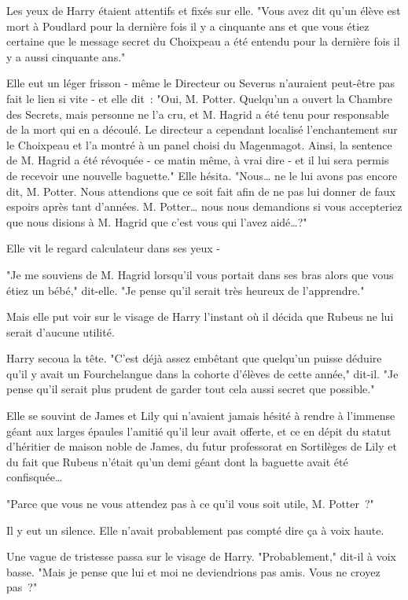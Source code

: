 Les yeux de Harry étaient attentifs et fixés sur elle. "Vous avez dit qu'un élève est mort à Poudlard pour la dernière fois il y a cinquante ans et que vous étiez certaine que le message secret du Choixpeau a été entendu pour la dernière fois il y a aussi cinquante ans."

Elle eut un léger frisson - même le Directeur ou Severus n'auraient peut-être pas fait le lien si vite - et elle dit~: "Oui, M. Potter. Quelqu'un a ouvert la Chambre des Secrets, mais personne ne l'a cru, et M. Hagrid a été tenu pour responsable de la mort qui en a découlé. Le directeur a cependant localisé l'enchantement sur le Choixpeau et l'a montré à un panel choisi du Magenmagot. Ainsi, la sentence de M. Hagrid a été révoquée - ce matin même, à vrai dire - et il lui sera permis de recevoir une nouvelle baguette." Elle hésita. "Nous… ne le lui avons pas encore dit, M. Potter. Nous attendions que ce soit fait afin de ne pas lui donner de faux espoirs après tant d'années. M. Potter… nous nous demandions si vous accepteriez que nous disions à M. Hagrid que c'est vous qui l'avez aidé…?"

Elle vit le regard calculateur dans ses yeux -

"Je me souviens de M. Hagrid lorsqu'il vous portait dans ses bras alors que vous étiez un bébé," dit-elle. "Je pense qu'il serait très heureux de l'apprendre."

Mais elle put voir sur le visage de Harry l'instant où il décida que Rubeus ne lui serait d'aucune utilité.

Harry secoua la tête. "C'est déjà assez embêtant que quelqu'un puisse déduire qu'il y avait un Fourchelangue dans la cohorte d'élèves de cette année," dit-il. "Je pense qu'il serait plus prudent de garder tout cela aussi secret que possible."

Elle se souvint de James et Lily qui n'avaient jamais hésité à rendre à l'immense géant aux larges épaules l'amitié qu'il leur avait offerte, et ce en dépit du statut d'héritier de maison noble de James, du futur professorat en Sortilèges de Lily et du fait que Rubeus n'était qu'un demi géant dont la baguette avait été confisquée…

"Parce que vous ne vous attendez pas à ce qu'il vous soit utile, M. Potter~?"

Il y eut un silence. Elle n'avait probablement pas compté dire ça à voix haute.

Une vague de tristesse passa sur le visage de Harry. "Probablement," dit-il à voix basse. "Mais je pense que lui et moi ne deviendrions pas amis. Vous ne croyez pas~?"

